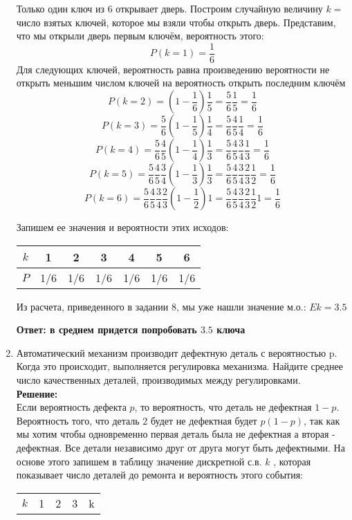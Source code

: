 \documentclass[a4paper,12pt]{article}
\begin{document}
\begin{enumerate}
Только один ключ из 6 открывает дверь. Построим случайную величину $k=$ число взятых ключей, которое мы взяли чтобы открыть дверь.
Представим, что мы открыли дверь первым ключём, вероятность этого:
$$P(k=1) = \frac{1}{6}$$
Для следующих ключей, вероятность равна произведению вероятности не открыть меньшим числом ключей на вероятность открыть последним ключём
$$P(k=2) = (1-\frac{1}{6})\frac{1}{5}=\frac{5}{6}\frac{1}{5}=\frac{1}{6}$$
$$P(k=3) = \frac{5}{6}(1-\frac{1}{5})\frac{1}{4}=\frac{5}{6}\frac{4}{5}\frac{1}{4}=\frac{1}{6}$$
$$P(k=4) = \frac{5}{6}\frac{4}{5}(1-\frac{1}{4})\frac{1}{3}=\frac{5}{6}\frac{4}{5}\frac{3}{4}\frac{1}{3}=\frac{1}{6}$$
$$P(k=5) = \frac{5}{6}\frac{4}{5}\frac{3}{4}(1-\frac{1}{3})\frac{1}{3}=\frac{5}{6}\frac{4}{5}\frac{3}{4}\frac{2}{3}\frac{1}{2}=\frac{1}{6}$$
$$P(k=6) = \frac{5}{6}\frac{4}{5}\frac{3}{4}\frac{2}{3}(1-\frac{1}{2})1=\frac{5}{6}\frac{4}{5}\frac{3}{4}\frac{2}{3}\frac{1}{2}1=\frac{1}{6}$$

Запишем ее значения и вероятности этих исходов:
\begin{center}
 \begin{tabular}{|c| c| c| c|c|c|c|} 
 \hline
 $k$ & 1 & 2 & 3 & 4 & 5& 6\\ 

 \hline
$P$ & 1/6 & 1/6 & 1/6 & 1/6 & 1/6& 1/6\\ 
\hline
\end{tabular}
\end{center}

Из расчета, приведенного в задании 8, мы уже нашли значение м.о.:
$Ek=3.5$

\textbf{Ответ: в среднем придется попробовать $3.5$ ключа}


\item Автоматический механизм производит дефектную деталь с вероятностью p. Когда это происходит, выполняется регулировка механизма. Найдите среднее число качественных деталей, производимых между регулировками.\\

\textbf{Решение:}\\
Если вероятность дефекта $p$, то вероятность, что деталь не дефектная $1-p$. Вероятность того, что деталь 2 будет не дефектная будет $p(1-p)$, так как мы хотим чтобы одновременно первая деталь была не дефектная а вторая - дефектная. Все детали независимо друг от друга могут быть дефектными. На основе этого запишем в таблицу значение дискретной с.в. $k$ , которая показывает число деталей до ремонта и вероятность этого события:
\begin{center}
 \begin{tabular}{|c| c| c| c|c|} 
 \hline
 $k$ & 1 & 2 & 3 & k\\ 


\end{tabular}
\end{center}
\end{enumerate}
\end{document}
